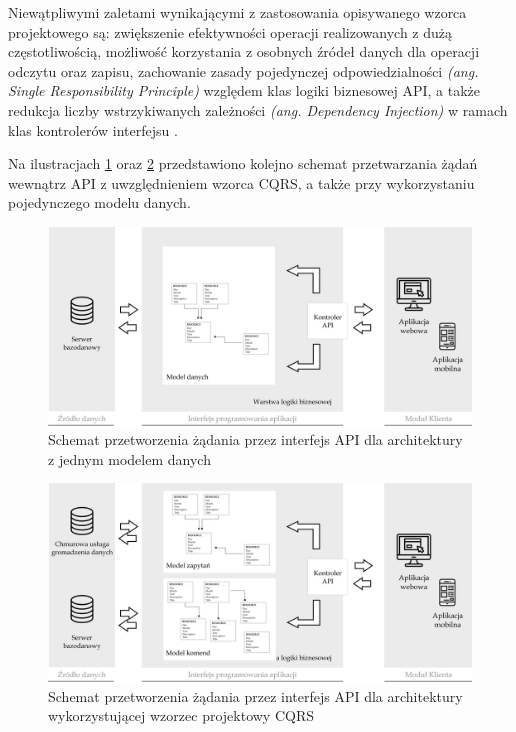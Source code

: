 Niewątpliwymi zaletami wynikającymi z zastosowania opisywanego wzorca projektowego są: zwiększenie efektywności operacji realizowanych z dużą częstotliwością, możliwość korzystania z osobnych źródeł danych dla operacji odczytu oraz zapisu, zachowanie zasady pojedynczej odpowiedzialności \textit{(ang. Single Responsibility Principle)} względem klas logiki biznesowej API, a także redukcja liczby wstrzykiwanych zależności \textit{(ang. Dependency Injection)} w ramach klas kontrolerów interfejsu \cite{cs7194}.

Na ilustracjach \ref{fig:standard-vs-cqrs1} oraz \ref{fig:standard-vs-cqrs2} przedstawiono kolejno schemat przetwarzania żądań wewnątrz API z uwzględnieniem wzorca CQRS, a także przy wykorzystaniu pojedynczego modelu danych.

\begin{figure}[ht]
    \centering
     \includegraphics[width=0.9\linewidth]{rys02/standard-vs-cqrs1.png}
    \caption{Schemat przetworzenia żądania przez interfejs API dla architektury z jednym modelem danych}
    \label{fig:standard-vs-cqrs1}
   \end{figure}

   \begin{figure}[ht]
    \centering
     \includegraphics[width=0.9\linewidth]{rys02/standard-vs-cqrs2.png}
    \caption{Schemat przetworzenia żądania przez interfejs API dla architektury wykorzystującej wzorzec projektowy CQRS}
    \label{fig:standard-vs-cqrs2}
   \end{figure}



